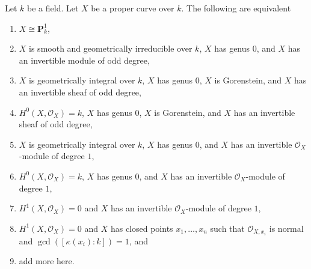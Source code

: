 \begin{proposition}
\label{proposition-projective-line}
Let $k$ be a field. Let $X$ be a proper curve over $k$.
The following are equivalent
\begin{enumerate}
\item $X \cong \mathbf{P}^1_k$,
\item $X$ is smooth and geometrically irreducible over $k$,
$X$ has genus $0$, and $X$ has an invertible module of odd degree,
\item $X$ is geometrically integral over $k$, $X$ has genus $0$,
$X$ is Gorenstein, and $X$ has an invertible sheaf of odd degree,
\item $H^0(X, \mathcal{O}_X) = k$, $X$ has genus $0$, $X$ is Gorenstein,
and $X$ has an invertible sheaf of odd degree,
\item $X$ is geometrically integral over $k$, $X$ has genus $0$,
and $X$ has an invertible $\mathcal{O}_X$-module of degree $1$,
\item $H^0(X, \mathcal{O}_X) = k$, $X$ has genus $0$,
and $X$ has an invertible $\mathcal{O}_X$-module of degree $1$,
\item $H^1(X, \mathcal{O}_X) = 0$ and $X$ has an invertible
$\mathcal{O}_X$-module of degree $1$,
\item $H^1(X, \mathcal{O}_X) = 0$ and $X$
has closed points $x_1, \ldots, x_n$ such that
$\mathcal{O}_{X, x_i}$ is normal and $\gcd([\kappa(x_i) : k]) = 1$, and
\item add more here.
\end{enumerate}
\end{proposition}

